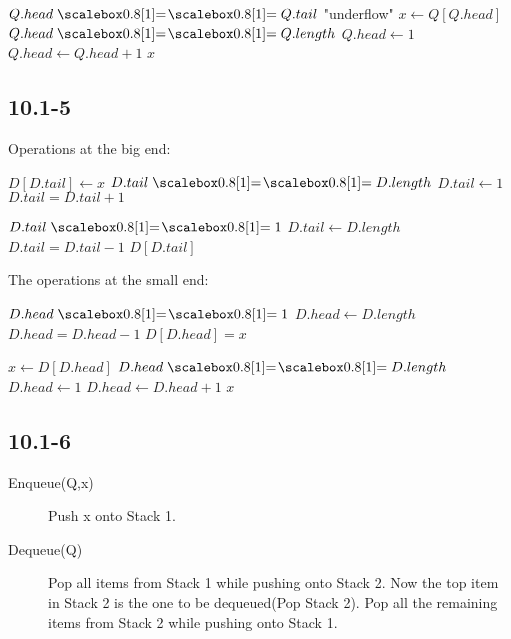 \documentclass{book}
\begin{document}
\begin{CJK}{UTF8}{gkai}
\begin{codebox}
\li \If $Q.head \isequal Q.tail$
\li \Then \Error "underflow"
\li \Else $x \gets Q[Q.head]$
\li \If $Q.head \isequal Q.length$
\li \Then $Q.head \gets 1$
\li \Else $Q.head \gets Q.head + 1$
\End
\li \Return $x$
\End
\end{codebox}

\subsection*{10.1-5}

Operations at the big end:
\begin{codebox}
\li $D[D.tail] \gets x $
\li \If $D.tail \isequal D.length$
\li \Then $D.tail \gets 1$
\li \Else $D.tail = D.tail + 1$
\End
\end{codebox}

\begin{codebox}
\li \If $D.tail \isequal 1$
\li \Then $D.tail \gets D.length$
\li \Else $D.tail = D.tail - 1$
\End
\li \Return $D[D.tail]$
\end{codebox}

The operations at the small end:
\begin{codebox}
\li \If $D.head \isequal 1$
\li \Then $D.head \gets D.length$
\li \Else $D.head = D.head - 1$
\End
\li $D[D.head] = x$
\end{codebox}

\begin{codebox}
\li $x \gets D[D.head]$
\li \If $D.head \isequal D.length$
\li \Then $D.head \gets 1$
\li \Else $D.head \gets D.head + 1$
\End
\li \Return $x$
\end{codebox}

\subsection*{10.1-6}

\begin{description}
\item[Enqueue(Q,x)] Push x onto Stack 1.
\item[Dequeue(Q)] Pop all items from Stack 1 while pushing onto Stack 2.  Now 
the top item in Stack 2 is the one to be dequeued(Pop Stack 2). Pop all the 
remaining items from Stack 2 while pushing onto Stack 1.
\end{description} 


\end{CJK}
\end{document}
